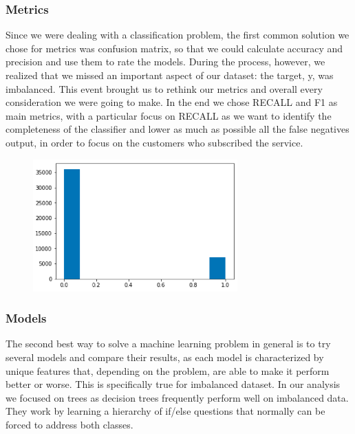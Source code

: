\subsubsection{Metrics}
Since we were dealing with a classification problem, the first common solution we chose for metrics was confusion matrix, so that we could calculate accuracy and precision and use them to rate the models. During the process, however, we realized that we missed an important aspect of our dataset: the target, y, was imbalanced.
This event brought us to rethink our metrics and overall every consideration we were going to make. In the end we chose RECALL and F1 as main metrics, with a particular focus on RECALL as we want to identify the completeness of the classifier and lower as much as possible all the false negatives output, in order to focus on the customers who subscribed the service. 

\begin{figure}[H]
\centering
\includegraphics[width=0.7\textwidth]{Img/imbalanced.png}
\end{figure}

\subsubsection{Models}
The second best way to solve a machine learning problem in general is to try several models and compare their results, as each model is characterized by unique features that, depending on the problem, are able to make it perform better or worse. This is specifically true for imbalanced dataset. In our analysis we focused on trees as decision trees frequently perform well on imbalanced data. They work by learning a hierarchy of if/else questions that normally can be forced to address both classes.

